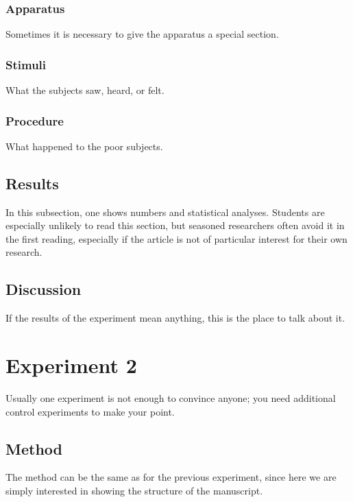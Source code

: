 \documentclass[man]{apa}
\begin{document}
\subsubsection{Apparatus}
Sometimes it is necessary to give the apparatus a special section.
\subsubsection{Stimuli}
What the subjects saw, heard, or felt.
\subsubsection{Procedure}
What happened to the poor subjects.
\subsection{Results}
In this subsection, one shows numbers and statistical analyses.  Students are especially unlikely to read this section, but seasoned researchers often avoid it in the first reading, especially if the article is not of particular interest for their own research.
\subsection{Discussion}
If the results of the experiment mean anything, this is the place to talk about it. 

\section{Experiment 2}
Usually one experiment is not enough to convince anyone; you need additional control experiments to make your point.
\subsection{Method}
The method can be the same as for the previous experiment, since here we are simply interested in showing the structure of the manuscript.
\end{document}
